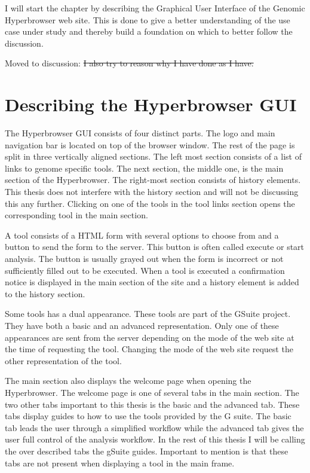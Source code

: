 \documentclass[english]{ifimaster}
\begin{document}
I will start the chapter by describing the Graphical User Interface of the Genomic Hyperbrowser web site. This is done to give a better understanding of the use case under study and thereby build a foundation on which to better follow the discussion. 

Moved to discussion: \sout{I also try to reason why I have done as I have.}
\section{Describing the Hyperbrowser GUI}
The Hyperbrowser GUI consists of four distinct parts. The logo and main navigation bar is located on top of the browser window. The rest of the page is split in three vertically aligned sections. The left most section consists of a list of links to genome specific tools. The next section, the middle one, is the main section of the Hyperbrowser. The right-most section consists of history elements. This thesis does not interfere with the history section and will not be discussing this any further. Clicking on one of the tools in the tool links section opens the corresponding tool in the main section. 

A tool consists of a HTML form with several options to choose from and a button to send the form to the server. This button is often called execute or start analysis. The button is usually grayed out when the form is incorrect or not sufficiently filled out to be executed. When a tool is executed a confirmation notice is displayed in the main section of the site and a history element is added to the history section.

Some tools has a dual appearance. These tools are part of the GSuite project. They have both a basic and an advanced representation. Only one of these appearances are sent from the server depending on the mode of the web site at the time of requesting the tool. Changing the mode of the web site request the other representation of the tool.

The main section also displays the welcome page when opening the Hyperbrowser. The welcome page is one of several tabs in the main section. The two other tabs important to this thesis is the basic and the advanced tab. These tabs display guides to how to use the tools provided by the G suite. The basic tab leads the user through a simplified workflow while the advanced tab gives the user full control of the analysis workflow. In the rest of this thesis I will be calling the over described tabs the gSuite guides. Important to mention is that these tabs are not present when displaying a tool in the main frame.
\end{document}

